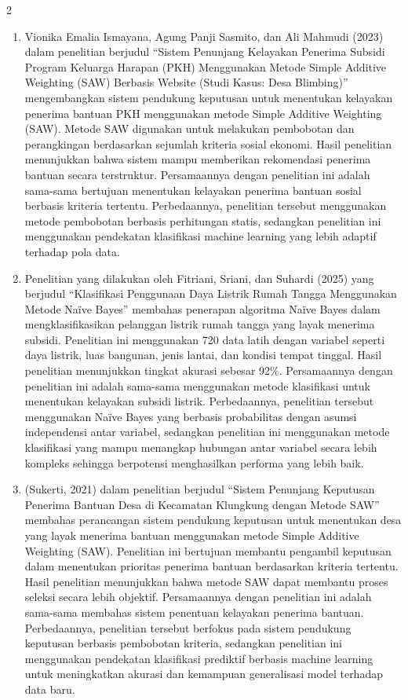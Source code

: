 \documentclass[12pt, a4paper, onecolumn, oneside]{report}
\begin{document}
\begin{spacing}{2}
\begin{enumerate}
    \item Vionika Emalia Ismayana, Agung Panji Sasmito, dan Ali Mahmudi (2023) dalam penelitian berjudul ``Sistem Penunjang Kelayakan Penerima Subsidi Program Keluarga Harapan (PKH) Menggunakan Metode Simple Additive Weighting (SAW) Berbasis Website (Studi Kasus: Desa Blimbing)'' mengembangkan sistem pendukung keputusan untuk menentukan kelayakan penerima bantuan PKH menggunakan metode Simple Additive Weighting (SAW). Metode SAW digunakan untuk melakukan pembobotan dan perangkingan berdasarkan sejumlah kriteria sosial ekonomi. Hasil penelitian menunjukkan bahwa sistem mampu memberikan rekomendasi penerima bantuan secara terstruktur. Persamaannya dengan penelitian ini adalah sama-sama bertujuan menentukan kelayakan penerima bantuan sosial berbasis kriteria tertentu. Perbedaannya, penelitian tersebut menggunakan metode pembobotan berbasis perhitungan statis, sedangkan penelitian ini menggunakan pendekatan klasifikasi machine learning yang lebih adaptif terhadap pola data.
    \item Penelitian yang dilakukan oleh Fitriani, Sriani, dan Suhardi (2025) yang berjudul ``Klasifikasi Penggunaan Daya Listrik Rumah Tangga Menggunakan Metode Naïve Bayes'' membahas penerapan algoritma Naïve Bayes dalam mengklasifikasikan pelanggan listrik rumah tangga yang layak menerima subsidi. Penelitian ini menggunakan 720 data latih dengan variabel seperti daya listrik, luas bangunan, jenis lantai, dan kondisi tempat tinggal. Hasil penelitian menunjukkan tingkat akurasi sebesar 92\%. Persamaannya dengan penelitian ini adalah sama-sama menggunakan metode klasifikasi untuk menentukan kelayakan subsidi listrik. Perbedaannya, penelitian tersebut menggunakan Naïve Bayes yang berbasis probabilitas dengan asumsi independensi antar variabel, sedangkan penelitian ini menggunakan metode klasifikasi yang mampu menangkap hubungan antar variabel secara lebih kompleks sehingga berpotensi menghasilkan performa yang lebih baik.
    \item (Sukerti, 2021) dalam penelitian berjudul ``Sistem Penunjang Keputusan Penerima Bantuan Desa di Kecamatan Klungkung dengan Metode SAW'' membahas perancangan sistem pendukung keputusan untuk menentukan desa yang layak menerima bantuan menggunakan metode Simple Additive Weighting (SAW). Penelitian ini bertujuan membantu pengambil keputusan dalam menentukan prioritas penerima bantuan berdasarkan kriteria tertentu. Hasil penelitian menunjukkan bahwa metode SAW dapat membantu proses seleksi secara lebih objektif. Persamaannya dengan penelitian ini adalah sama-sama membahas sistem penentuan kelayakan penerima bantuan. Perbedaannya, penelitian tersebut berfokus pada sistem pendukung keputusan berbasis pembobotan kriteria, sedangkan penelitian ini menggunakan pendekatan klasifikasi prediktif berbasis machine learning untuk meningkatkan akurasi dan kemampuan generalisasi model terhadap data baru.

\end{enumerate}
\end{spacing}
\end{document}

